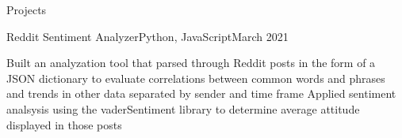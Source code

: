 \documentclass[11pt,fit=false]{cv_template}
\begin{document}
\begin{cv}
\begin{cvsection}{Projects}


\begin{cvsubsection}
{Reddit Sentiment Analyzer}{Python, JavaScript}{March 2021}{}

\listitem  Built an analyzation tool that parsed through Reddit posts in the form of a JSON dictionary to evaluate correlations between common words and phrases and trends in other data separated by sender and time frame
\listitem  Applied sentiment analsysis using the vaderSentiment library to determine average attitude displayed in those posts

\end{cvsubsection}






\end{cvsection}


\end{cv}

\end{document}
